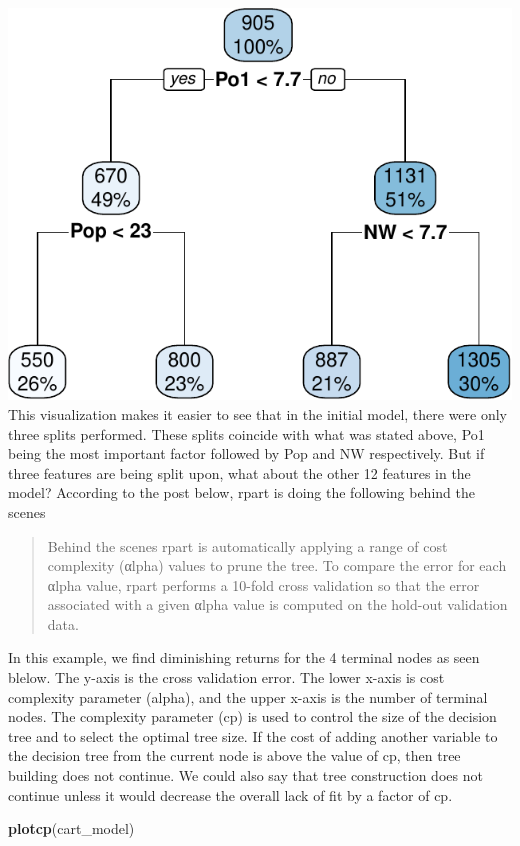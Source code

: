 \documentclass[]{article}
\newenvironment{Shaded}{\begin{snugshade}}{\end{snugshade}}
\newcommand{\KeywordTok}[1]{\textcolor[rgb]{0.13,0.29,0.53}{\textbf{#1}}}
\newcommand{\NormalTok}[1]{#1}
\begin{document}
\includegraphics{HW7_files/figure-latex/unnamed-chunk-4-1.pdf} This
visualization makes it easier to see that in the initial model, there
were only three splits performed. These splits coincide with what was
stated above, Po1 being the most important factor followed by Pop and NW
respectively. But if three features are being split upon, what about the
other 12 features in the model? According to the post below, rpart is
doing the following behind the scenes

\begin{quote}
Behind the scenes rpart is automatically applying a range of cost
complexity (αlpha) values to prune the tree. To compare the error for
each αlpha value, rpart performs a 10-fold cross validation so that the
error associated with a given αlpha value is computed on the hold-out
validation data.
\end{quote}

In this example, we find diminishing returns for the 4 terminal nodes as
seen blelow. The y-axis is the cross validation error. The lower x-axis
is cost complexity parameter (alpha), and the upper x-axis is the number
of terminal nodes. The complexity parameter (cp) is used to control the
size of the decision tree and to select the optimal tree size. If the
cost of adding another variable to the decision tree from the current
node is above the value of cp, then tree building does not continue. We
could also say that tree construction does not continue unless it would
decrease the overall lack of fit by a factor of cp.

\begin{Shaded}
\begin{Highlighting}[]
\KeywordTok{plotcp}\NormalTok{(cart_model)}
\end{Highlighting}
\end{Shaded}
\end{document}
